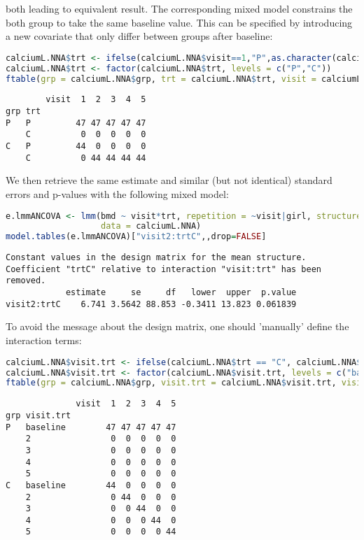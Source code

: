 \documentclass[12pt]{article}
\begin{document}
both leading to equivalent result. The corresponding mixed model
constrains the both group to take the same baseline value. This can be
specified by introducing a new covariate that only differ between
groups after baseline:
\begin{lstlisting}[language=r,numbers=none]
calciumL.NNA$trt <- ifelse(calciumL.NNA$visit==1,"P",as.character(calciumL.NNA$grp))
calciumL.NNA$trt <- factor(calciumL.NNA$trt, levels = c("P","C"))
ftable(grp = calciumL.NNA$grp, trt = calciumL.NNA$trt, visit = calciumL.NNA$visit)
\end{lstlisting}

\label{}
\begin{verbatim}
        visit  1  2  3  4  5
grp trt                     
P   P         47 47 47 47 47
    C          0  0  0  0  0
C   P         44  0  0  0  0
    C          0 44 44 44 44
\end{verbatim}


We then retrieve the same estimate and similar (but not identical)
standard errors and p-values with the following mixed model:
\begin{lstlisting}[language=r,numbers=none]
e.lmmANCOVA <- lmm(bmd ~ visit*trt, repetition = ~visit|girl, structure = UN,
                   data = calciumL.NNA)
model.tables(e.lmmANCOVA)["visit2:trtC",,drop=FALSE]
\end{lstlisting}

\label{}
\begin{verbatim}
Constant values in the design matrix for the mean structure.
Coefficient "trtC" relative to interaction "visit:trt" has been removed.
            estimate     se     df   lower  upper  p.value
visit2:trtC    6.741 3.5642 88.853 -0.3411 13.823 0.061839
\end{verbatim}


\clearpage

To avoid the message about the design matrix, one should 'manually'
define the interaction terms:
\begin{lstlisting}[language=r,numbers=none]
calciumL.NNA$visit.trt <- ifelse(calciumL.NNA$trt == "C", calciumL.NNA$visit, "baseline")
calciumL.NNA$visit.trt <- factor(calciumL.NNA$visit.trt, levels = c("baseline",2:5))
ftable(grp = calciumL.NNA$grp, visit.trt = calciumL.NNA$visit.trt, visit = calciumL.NNA$visit)
\end{lstlisting}

\label{}
\begin{verbatim}
              visit  1  2  3  4  5
grp visit.trt                     
P   baseline        47 47 47 47 47
    2                0  0  0  0  0
    3                0  0  0  0  0
    4                0  0  0  0  0
    5                0  0  0  0  0
C   baseline        44  0  0  0  0
    2                0 44  0  0  0
    3                0  0 44  0  0
    4                0  0  0 44  0
    5                0  0  0  0 44
\end{verbatim}
\end{document}
